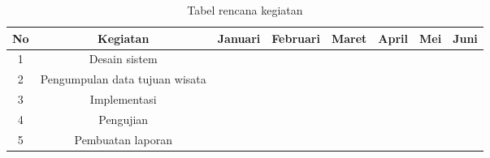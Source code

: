 \begin{table}[h!]

\begin{tabular}{||c c c c c c c c||} 
 \hline
 No & Kegiatan & Januari & Februari & Maret & April & Mei & Juni \\ [1ex] 
 \hline\hline
 1 & Desain sistem & \cellcolor{blue!25} & \cellcolor{blue!25} & &&&\\ 
 2 & Pengumpulan data tujuan wisata & & \cellcolor{blue!25} & &&&\\ 
 3 & Implementasi & & \cellcolor{blue!25} & \cellcolor{blue!25} & \cellcolor{blue!25} &&\\
 4 & Pengujian & & & & & \cellcolor{blue!25} &\\
 5 & Pembuatan laporan & & & & & \cellcolor{blue!25} & \cellcolor{blue!25} \\ [1ex]

 \hline
\end{tabular}
\caption{Tabel rencana kegiatan}
\label{table:1}
\end{table}
